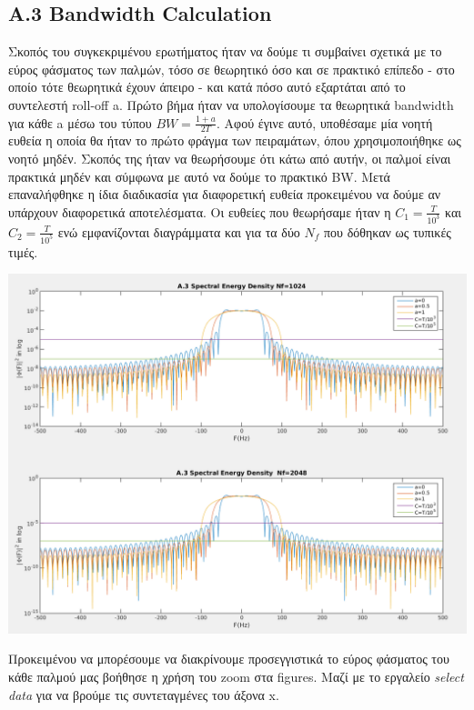 \documentclass[11pt]{article}
\begin{document}
    \subsection*{Α.3 Bandwidth Calculation}
    Σκοπός του συγκεκριμένου ερωτήματος ήταν να δούμε τι συμβαίνει σχετικά με το εύρος φάσματος των παλμών, τόσο σε θεωρητικό όσο και σε πρακτικό επίπεδο - στο οποίο τότε θεωρητικά έχουν άπειρο - και κατά πόσο αυτό εξαρτάται από το συντελεστή roll-off a. Πρώτο βήμα ήταν να υπολογίσουμε τα θεωρητικά bandwidth για κάθε a μέσω του τύπου $BW = \frac{1+a}{2T}$. Αφού έγινε αυτό, υποθέσαμε μία νοητή ευθεία η οποία θα ήταν το πρώτο φράγμα των πειραμάτων, όπου χρησιμοποιήθηκε ως νοητό μηδέν. Σκοπός της ήταν να θεωρήσουμε ότι κάτω από αυτήν, οι παλμοί είναι πρακτικά μηδέν και σύμφωνα με αυτό να δούμε το πρακτικό BW. Μετά επαναλήφθηκε η ίδια διαδικασία για διαφορετική ευθεία προκειμένου να δούμε αν υπάρχουν διαφορετικά αποτελέσματα. Οι ευθείες που θεωρήσαμε ήταν η $C_1 = \frac{T}{10^3}$ και $C_2=\frac{T}{10^5}$ ενώ εμφανίζονται διαγράμματα και για τα δύο $N_f$ που δόθηκαν ως τυπικές τιμές.

    \begin{center}
        \includegraphics[scale=0.35]{photos/A.3 Bandwidth_screenshot.png}
    \end{center} 
    
    \par \noindent
    Προκειμένου να μπορέσουμε να διακρίνουμε προσεγγιστικά το εύρος φάσματος του κάθε παλμού μας βοήθησε η χρήση του zoom στα figures. Μαζί με το εργαλείο \emph{select data} για να βρούμε τις συντεταγμένες του άξονα x.
    
\end{document}

